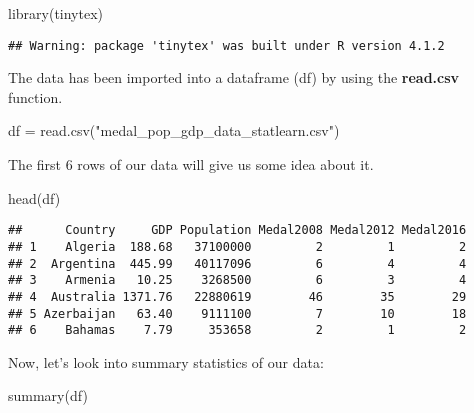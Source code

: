 \documentclass[
]{article}
\newenvironment{Shaded}{\begin{snugshade}}{\end{snugshade}}
\newcommand{\FunctionTok}[1]{\textcolor[rgb]{0.00,0.00,0.00}{#1}}
\newcommand{\NormalTok}[1]{#1}
\newcommand{\OtherTok}[1]{\textcolor[rgb]{0.56,0.35,0.01}{#1}}
\newcommand{\StringTok}[1]{\textcolor[rgb]{0.31,0.60,0.02}{#1}}
\begin{document}
\begin{Shaded}
\begin{Highlighting}[]
\FunctionTok{library}\NormalTok{(tinytex)}
\end{Highlighting}
\end{Shaded}

\begin{verbatim}
## Warning: package 'tinytex' was built under R version 4.1.2
\end{verbatim}

The data has been imported into a dataframe (df) by using the
\textbf{read.csv} function.

\begin{Shaded}
\begin{Highlighting}[]
\NormalTok{df }\OtherTok{=} \FunctionTok{read.csv}\NormalTok{(}\StringTok{"medal\_pop\_gdp\_data\_statlearn.csv"}\NormalTok{)}
\end{Highlighting}
\end{Shaded}

The first 6 rows of our data will give us some idea about it.

\begin{Shaded}
\begin{Highlighting}[]
\FunctionTok{head}\NormalTok{(df)}
\end{Highlighting}
\end{Shaded}

\begin{verbatim}
##      Country     GDP Population Medal2008 Medal2012 Medal2016
## 1    Algeria  188.68   37100000         2         1         2
## 2  Argentina  445.99   40117096         6         4         4
## 3    Armenia   10.25    3268500         6         3         4
## 4  Australia 1371.76   22880619        46        35        29
## 5 Azerbaijan   63.40    9111100         7        10        18
## 6    Bahamas    7.79     353658         2         1         2
\end{verbatim}

Now, let's look into summary statistics of our data:

\begin{Shaded}
\begin{Highlighting}[]
\FunctionTok{summary}\NormalTok{(df)}
\end{Highlighting}
\end{Shaded}
\end{document}
